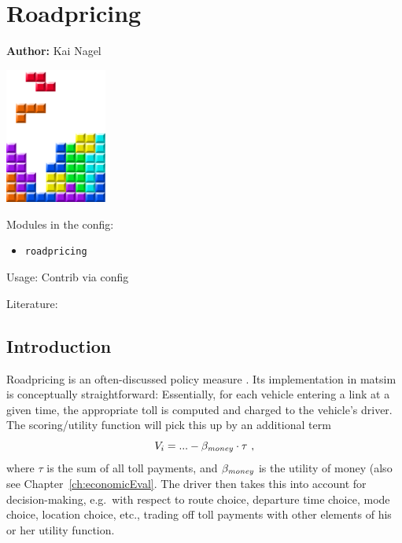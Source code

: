 \chapter{Roadpricing }
\label{ch:roadpricing}

\hfill \textbf{Author:} Kai Nagel

\begin{center} \includegraphics[width=0.25\textwidth, angle=0]{figures/MATSimBook.png} \end{center}

Modules in the config: 
\begin{itemize}
	\item \lstinline|roadpricing|
\end{itemize}

Usage: Contrib via config 

Literature: \citet[][]{RieserEtAl_TechRep_VSP_2007, Rieser_unpub_IVT_2008, GretherEtAl_ERSA_2008, RieserEtAl_TRBTDF_2008} 


\section{Introduction}

Roadpricing is an often-discussed policy measure \citep[e.g.][]{}.  Its implementation in \acrshort{matsim} is conceptually straightforward: Essentially, for each vehicle entering a link at a given time, the appropriate toll is computed and charged to the vehicle's driver.  The scoring/utility function will pick this up by an additional term
\[
V_i = ... - \beta_{\it money} \cdot \tau \ ,
\]
where $\tau$ is the sum of all toll payments, and $\beta_{\it money}$ is the utility of money (also see Chapter~\ref{ch:economicEval}.  The driver then takes this into account for decision-making, e.g.\ with respect to route choice, departure time choice, mode choice, location choice, etc., trading off toll payments with other elements of his or her utility function.

